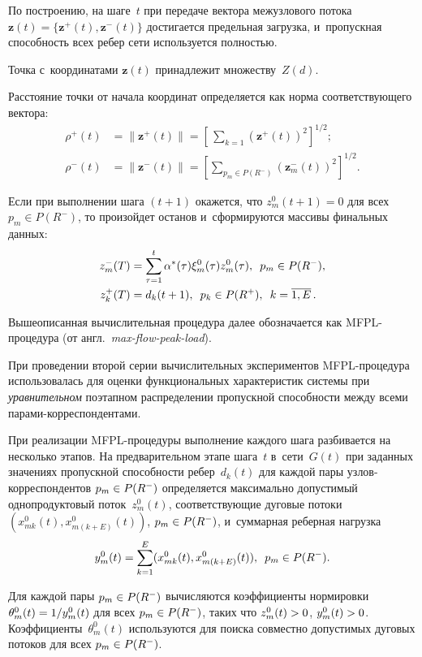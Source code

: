 \begin{multicols}{2}
По построению, на шаге~$t$ при передаче вектора межузлового потока
$\mathbf{z}(t)=\{\mathbf{z}^+(t), \mathbf{z}^-(t)\}$ достигается
предельная загрузка, и~пропускная способность всех ребер  сети
используется полностью.

Точка с~координатами $\mathbf{z}(t)$ принадлежит множеству~$Z(d)$.

Расстояние точки от начала координат определяется как норма
соответствующего вектора:
\begin{align*}
\rho^+(t)&=\|\mathbf{z}^+(t)\|=
\left[\,\sum\limits_{k=1}(\mathbf{z}^+(t))^2\right]^{1/2};
\\
\rho^-(t)&=\|\mathbf{z}^-(t)\|= \left[\sum\limits_{p_m\in P(R^-)}(\mathbf{z}_m^-(t))^2\right]^{1/2}.
\end{align*}

Если при выполнении шага $(t+1)$ окажется, что $z_m^0(t+1)=0$ для
всех $p_m\in P(R^-)$, то про\-изойдет останов и~сформируются
массивы финальных данных:
\begin{align*}
z_m^-(T)&=\sum\limits_{\tau=1}^t \alpha^*(\tau)\xi_m^0(\tau) z_m^0(\tau),\enskip 
p_m\in P(R^-),\\
z_k^+(T)&=d_k(t+1),\enskip p_k\in P(R^+),\enskip k=\overline{1,E}\,.
\end{align*}

Вышеописанная вычислительная процедура далее обозначается как
MFPL-про\-це\-ду\-ра (от англ.\ \textit{max-flow-peak-load}).

При проведении второй серии вычислительных экспериментов
MFPL-про\-це\-ду\-ра использовалась для оценки функциональных
характеристик сис\-те\-мы при \textit{уравнительном} поэтапном
распределении пропускной способности между всеми
па\-ра\-ми-кор\-рес\-пон\-ден\-тами.

При реализации MFPL-процедуры выполнение каждого шага разбивается
на несколько этапов. На предварительном этапе шага~$t$ 
в~сети~$G(t)$ при заданных значениях пропускной способности ребер~$d_k(t)$ 
для каждой пары уз\-лов-кор\-рес\-пон\-ден\-тов $p_m\hm\in P(R^-)$
определяется максимально допустимый однопродуктовый
поток~$z_m^0(t)$, соответствующие дуговые потоки
$\left(x_{mk}^0(t),x_{m(k+E)}^0(t)\right)$, $p_m\hm\in P(R^-)$, и~суммарная
реберная нагрузка
$$
y_m^0(t)=\sum\limits_{k=1}^E (x_{mk}^0(t),x_{m(k+E)}^0(t)),\enskip p_m\in P(R^-).
$$

Для каждой пары $p_m\hm\in P(R^-)$ вычисляются коэффициенты
нормировки
$\theta_m^0(t)\hm={1}/{y_m^0(t)}$ для всех  
$p_m\hm\in P(R^-)$, таких что  $z^0_m(t)\hm>0$,
$y_m^0(t)\hm>0$.
Коэффициенты~$\theta_m^0(t)$ используются для поиска совместно
допустимых дуговых потоков для всех $p_m\hm\in P(R^-)$.


\end{multicols}
